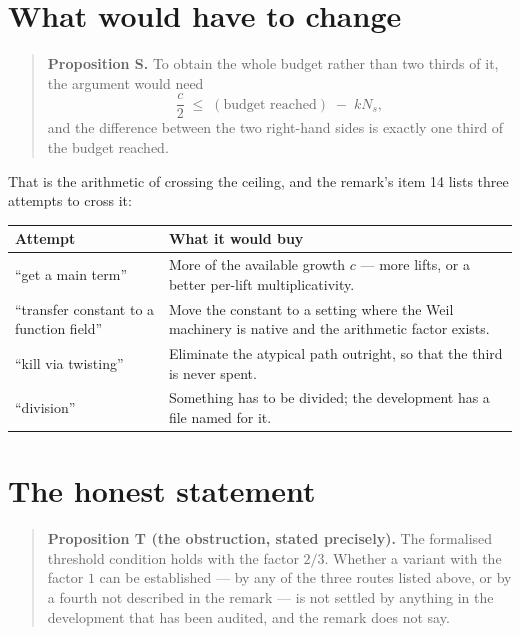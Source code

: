 \section{What would have to change}\begin{quote}
\textbf{Proposition S.} To obtain the whole budget rather than two thirds of
it, the argument would need
\[
\frac{c}{2} \;\le\; (\text{budget reached}) \;-\; kN_s,
\]
and the difference between the two right-hand sides is exactly one third of
the budget reached.
\end{quote}

That is the arithmetic of crossing the ceiling, and the remark's item 14 lists
three attempts to cross it:

\begin{center}
\begin{tabular}{@{}>{\RaggedRight\arraybackslash\hyphenpenalty=10000\exhyphenpenalty=10000}p{}>{\RaggedRight\arraybackslash\hyphenpenalty=10000\exhyphenpenalty=10000}p{}@{}}
\toprule
\textbf{Attempt} & \textbf{What it would buy} \\
\midrule
``get a main term'' & More of the available growth $c$ --- more lifts, or a
better per-lift multiplicativity. \\
``transfer constant to a function field'' & Move the constant to a setting
where the Weil machinery is native and the arithmetic factor exists. \\
``kill via twisting'' & Eliminate the atypical path outright, so that the
third is never spent. \\
``division'' & Something has to be divided; the development has a file named
for it. \\
\bottomrule
\end{tabular}
\end{center}

\section{The honest statement}\begin{quote}
\textbf{Proposition T (the obstruction, stated precisely).} The formalised
threshold condition holds with the factor $2/3$. Whether a variant with the
factor $1$ can be established --- by any of the three routes listed above, or
by a fourth not described in the remark --- is not settled by anything in the
development that has been audited, and the remark does not say.
\end{quote}

